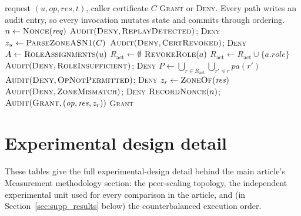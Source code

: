 \begin{widealg}
\caption{Access decision (\texttt{CheckAccess})}
\label{alg:decision}
\small
\begin{algorithmic}[1]
\Require request $(u, \mathit{op}, \mathit{res}, t)$, caller certificate $C$
\Ensure \textsc{Grant} or \textsc{Deny}. Every path writes an audit entry,
  so every invocation mutates state and commits through ordering.
\State $n \gets \textsc{Nonce}(\mathit{req})$
  \State $\textsc{Audit}(\textsc{Deny}, \textsc{ReplayDetected})$;\;
         \Return \textsc{Deny}
\EndIf
\State $z_u \gets \textsc{ParseZoneASN1}(C)$
  \State $\textsc{Audit}(\textsc{Deny}, \textsc{CertRevoked})$;\;
         \Return \textsc{Deny}
\EndIf
\State $A \gets \textsc{RoleAssignments}(u)$
\State $R_{\text{act}} \gets \emptyset$
    \State $\textsc{RevokeRole}(a)$
  \Else
    \State $R_{\text{act}} \gets R_{\text{act}} \cup \{a.\mathit{role}\}$
  \EndIf
\EndFor
{}
  \State $\textsc{Audit}(\textsc{Deny}, \textsc{RoleInsufficient})$;\;
         \Return \textsc{Deny}
\EndIf
\State $P \gets \bigcup_{r \in R_{\text{act}}}
        \bigcup_{r' \preceq r} pa(r')$
  \State $\textsc{Audit}(\textsc{Deny}, \textsc{OpNotPermitted})$;\;
         \Return \textsc{Deny}
\EndIf
\State $z_r \gets \textsc{ZoneOf}(\mathit{res})$
  \State $\textsc{Audit}(\textsc{Deny}, \textsc{ZoneMismatch})$;\;
         \Return \textsc{Deny}
\EndIf
\State $\textsc{RecordNonce}(n)$;\;
       $\textsc{Audit}(\textsc{Grant}, (\mathit{op}, \mathit{res}, z_r))$
\State \Return \textsc{Grant}
\end{algorithmic}
\end{widealg}

\clearpage
\section{Experimental design detail}
\label{sec:supp_design}

These tables give the full experimental-design detail behind the main
article's Measurement methodology section: the peer-scaling topology, the
independent experimental unit used for every comparison in the article,
and (in Section~\ref{sec:supp_results} below) the counterbalanced
execution order.

